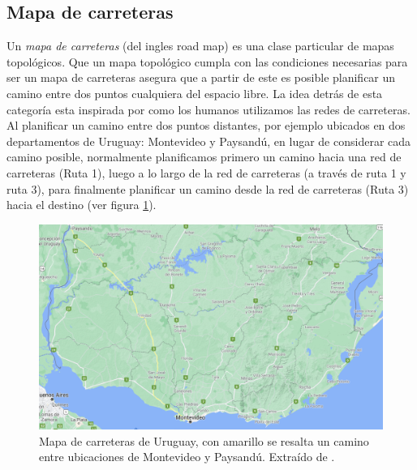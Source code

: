 \subsection{Mapa de carreteras}\label{subsec:mapacarr}
Un \emph{mapa de carreteras} (del ingles road map) \cite{choset2005principles} es una clase particular de mapas topológicos. Que un mapa topológico cumpla con las condiciones necesarias para ser un mapa de carreteras asegura que a partir de este es posible planificar un camino entre dos puntos cualquiera del espacio libre. La idea detrás de esta categoría esta inspirada por como los humanos utilizamos las redes de carreteras. Al planificar un camino entre dos puntos distantes, por ejemplo ubicados en dos departamentos de Uruguay: Montevideo y Paysandú, en lugar de considerar cada camino posible, normalmente planificamos primero un camino hacia una red de carreteras (Ruta 1), luego a lo largo de la red de carreteras (a través de ruta 1 y ruta 3), para finalmente planificar un camino desde la red de carreteras (Ruta 3) hacia el destino (ver figura \ref{fig:ejemplovial}). 

\begin{figure}[H]
  \center
  \includegraphics[width=0.9\linewidth]{imagenes/uruguayvialMarcado.png}
  \caption{Mapa de carreteras de Uruguay, con amarillo se resalta un camino entre ubicaciones de Montevideo y Paysandú. Extraído de \cite{googlemaps}.}\label{fig:ejemplovial}
\end{figure} 

